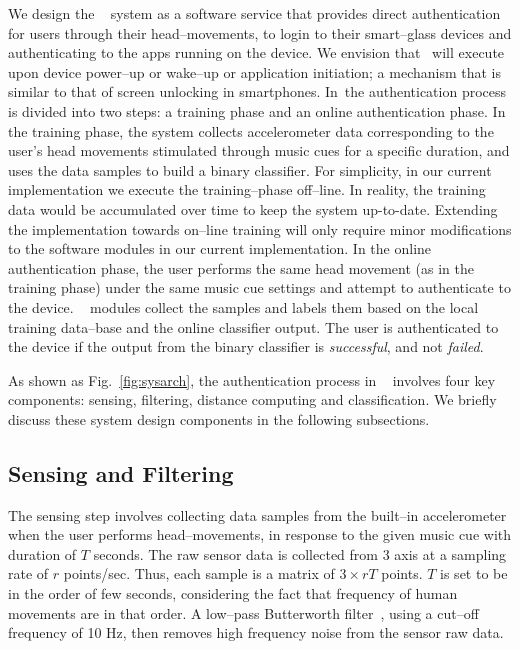 We design the \systemname~ system as a software service that provides direct authentication for users through their head--movements, to login to their smart--glass devices and authenticating to the apps running on the device. We envision that \systemname~will execute upon device power--up or wake--up or application initiation; a mechanism that is similar to that of screen unlocking in smartphones.
In~\systemname the authentication process is divided into two steps: a training phase and an online authentication phase. In the training phase, the system collects accelerometer data corresponding to the user's head movements stimulated through music cues for a specific duration, and uses the data samples to build a binary classifier. For simplicity, in our current implementation we execute the training--phase off--line. In reality, the training data would be accumulated over time to keep the system up-to-date. Extending the implementation towards on--line training will only require minor modifications to the software modules in our current implementation. In the online authentication phase, the user performs the same head movement (as in the training phase) under the same music cue settings and attempt to authenticate to the device. \systemname~ modules collect the samples and labels them based on the local training data--base and the online classifier output. The user is authenticated to the device if the output from the binary classifier is \textit{successful}, and not \textit{failed}.

As shown as Fig.~\ref{fig:sysarch}, the authentication process in \systemname~ involves four key components: sensing, filtering, distance computing and classification. We briefly discuss these system design components in the following subsections.

\subsection{Sensing and Filtering}
The sensing step involves collecting data samples from the built--in accelerometer when the user performs head--movements, in response to the given music cue with duration of $T$ seconds. The raw sensor data is collected from 3 axis at a sampling rate of $r$ points/sec. Thus, each sample is a matrix of $3 \times rT$ points. $T$ is set to be in the order of few seconds, considering the fact that frequency of human movements are in that order.
A low--pass Butterworth filter~\cite{challis1983design}, using a cut--off frequency of 10 Hz, then removes high frequency noise from the sensor raw data.


